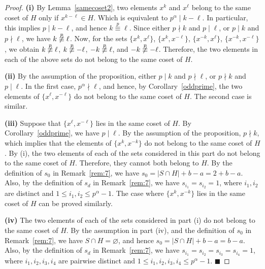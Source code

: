 \documentclass[12pt]{article}
\begin{document}
\begin{proof}
\textbf{(i)} By Lemma~\ref{samecoset2}, two elements \(x^k\) and \(x^\ell\) belong to the same coset of \(H\) only if \(x^{k-\ell}\in H\). Which is equivalent to \(p^\alpha\mid k-\ell\). In particular, this implies \(p\mid k-\ell \), and hence \(k\stackrel{p}{\equiv}\ell\). Since either \(p\nmid k\) and \(p\mid\ell\), or \(p\mid k\) and \(p\nmid\ell\), we have \(k\not\stackrel{p}{\equiv}\ell\). Now, for the sets \(\{x^k,x^{\ell}\}\), \(\{x^k,x^{-\ell}\}\), \(\{x^{-k},x^\ell\}\), \(\{x^{-k},x^{-\ell}\}\), we obtain \(k\not\stackrel{p}{\equiv}\ell\), \(k\not\stackrel{p}{\equiv}-\ell\), \(-k\not\stackrel{p}{\equiv}\ell\), and \(-k\not\stackrel{p}{\equiv}-\ell\). Therefore, the two elements in each of the above sets do not belong to the same coset of \(H\).

\textbf{(ii)} By the assumption of the proposition, either  \(p\mid k\) and \(p\nmid \ell\), or \(p\nmid k\) and \(p\mid \ell\). In the first case, \(p^\alpha\nmid \ell\), and hence, by Corollary~\ref{oddprime}, the two elements of \(\{x^\ell,x^{-\ell}\}\) do not belong to the same coset of \(H\). The second case is similar.
	
\textbf{(iii)} Suppose that \(\{x^\ell,x^{-\ell}\}\) lies in the same coset of \(H\). By Corollary~\ref{oddprime}, we have \(p\mid\ell\). By the assumption of the proposition, \(p\nmid k\), which implies that the elements of \(\{x^k,x^{-k}\}\) do not belong to the same coset of \(H\).
By (i), the two elements of each of the sets considered in this part do not belong to the same coset of \(H\). Therefore, they cannot both belong to \(H\). By the definition of \(s_0\) in Remark~\ref{rem:7}, we have \(s_0=|S\cap H|+b-a=2+b-a\). Also, by the definition of \(s_d\) in Remark~\ref{rem:7}, we have \(s_{i_1}=s_{i_2}=1\), where \(i_1,i_2\) are distinct and \(1\le i_1,i_2\le p^\alpha-1\).
The case where \(\{x^k,x^{-k}\}\) lies in the same coset of \(H\) can be proved similarly.

\textbf{(iv)} The two elements of each of the sets considered in part (i) do not belong to the same coset of \(H\). By the assumption in part (iv), and the definition of \(s_0\) in Remark~\ref{rem:7}, we have \(S\cap H=\varnothing\), and hence \(s_0=|S\cap H|+b-a=b-a\). Also, by the definition of \(s_d\) in Remark~\ref{rem:7}, we have \(s_{i_1}=s_{i_2}=s_{i_3}=s_{i_4}=1\), where \(i_1,i_2,i_3,i_4\) are pairwise distinct and \(1\le i_1,i_2,i_3,i_4\le p^\alpha-1\).  \hfill$\blacksquare$ 	
	\end{proof}	
  	
\end{document}
